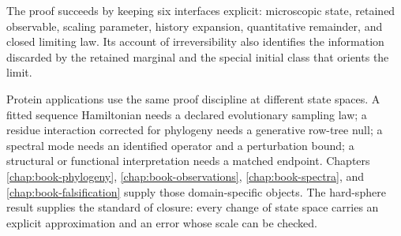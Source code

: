 The proof succeeds by keeping six interfaces explicit: microscopic state, retained observable,
scaling parameter, history expansion, quantitative remainder, and closed limiting law.  Its account
of irreversibility also identifies the information discarded by the retained marginal and the
special initial class that orients the limit.

Protein applications use the same proof discipline at different state spaces.  A fitted sequence
Hamiltonian needs a declared evolutionary sampling law; a residue interaction corrected for
phylogeny needs a generative row-tree null; a spectral mode needs an identified operator and a
perturbation bound; a structural or functional interpretation needs a matched endpoint.  Chapters
\ref{chap:book-phylogeny}, \ref{chap:book-observations}, \ref{chap:book-spectra}, and
\ref{chap:book-falsification} supply those domain-specific objects.  The hard-sphere result supplies
the standard of closure: every change of state space carries an explicit approximation and an error
whose scale can be checked.
